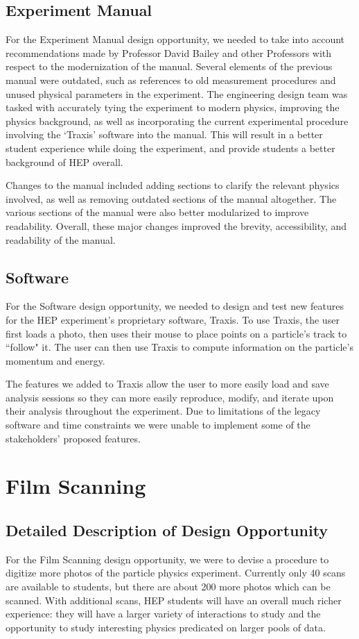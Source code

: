 \documentclass[12pt]{article} %
\begin{document}
\subsection{Experiment Manual}
For the Experiment Manual design opportunity, we needed to take into account recommendations made by Professor David Bailey and other Professors with respect to the modernization of the manual. Several elements of the previous manual were outdated, such as references to old measurement procedures and unused physical parameters in the experiment. The engineering design team was tasked with accurately tying the experiment to modern physics, improving the physics background, as well as incorporating the current experimental procedure involving the `Traxis' software into the manual. This will result in a better student experience while doing the experiment, and provide students a better background of HEP overall. 

Changes to the manual included adding sections to clarify the relevant physics involved, as well as removing outdated sections of the manual altogether. The various sections of the manual were also better modularized to improve readability. Overall, these major changes improved the brevity, accessibility, and readability of the manual.

\subsection{Software}
For the Software design opportunity, we needed to design and test new features for the HEP experiment's proprietary software, Traxis. To use Traxis, the user first loads a photo, then uses their mouse to place points on a particle's track to ``follow" it. The user can then use Traxis to compute information on the particle's momentum and energy.

The features we added to Traxis allow the user to more easily load and save analysis sessions so they can more easily reproduce, modify, and iterate upon their analysis throughout the experiment. Due to limitations of the legacy software and time constraints we were unable to implement some of the stakeholders' proposed features. 

\newpage \section{Film Scanning}
\subsection{Detailed Description of Design Opportunity}
For the Film Scanning design opportunity, we were to devise a procedure to digitize more photos of the particle physics experiment. Currently only 40 scans are available to students, but there are about 200 more photos which can be scanned. With additional scans, HEP students will have an overall much richer experience: they will have a larger variety of interactions to study and the opportunity to study interesting physics predicated on larger pools of data.
\end{document}
